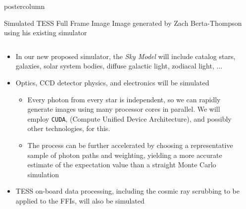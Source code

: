 \documentclass[final,hyperref={pdfpagelabels=false}]{beamer}
\newlength{\columnheight}
\begin{document}
\begin{frame}
\begin{columns}
    \begin{column}{.49\textwidth}
      \begin{beamercolorbox}[center,wd=\textwidth]{postercolumn}
        \begin{minipage}[T]{.95\textwidth}
          \parbox[t][\columnheight]{\textwidth}{
            \begin{block}{Simulated TESS Full Frame Image}
            Image generated by Zach Berta-Thompson using his existing simulator
              \begin{columns}
                \begin{column}{.70\textwidth}
                \begin{itemize}
                    \item In our new proposed simulator, the \emph{Sky Model} will include catalog stars, galaxies, solar system bodies, diffuse galactic light, zodiacal light, ...
                    \vfill
                    \item Optics, CCD detector physics, and electronics will be simulated
                    \begin{itemize}
                    	\item Every photon from every star is independent, so we can rapidly generate images using many processor cores in parallel. We will employ \texttt{CUDA}, (Compute Unified Device Architecture), and possibly other technologies, for this. 
			\item The process can be further accelerated by choosing a representative sample of photon paths and weighting, yielding a more accurate estimate of the expectation value than a straight Monte Carlo simulation
                    \end{itemize}
                    \vfill
                    \item TESS on-board data processing, including the cosmic ray scrubbing to be applied to the FFIs, will also be simulated
                    \vfill
                \end{itemize}
                \end{column}
                \begin{column}{.28\textwidth}

\end{column}
\end{columns}
\end{block}}
\end{minipage}
\end{beamercolorbox}
\end{column}
\end{columns}
\end{frame}
\end{document}
